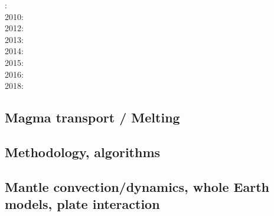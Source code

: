 : \cite{gamc08}\\
2010: \cite{stto10}\\
2012: \cite{stto12}\\
2013: \cite{limc13}\cite{bogs13a}\\
2014: \cite{budt14}\\
2015: \cite{musd15}\cite{hafg15}\\
2016: \cite{dost16}\\
2018: \cite{daga18}

\subsection*{Magma transport / Melting}

\cite{yatd12}
\cite{lorg18}

\subsection*{Methodology, algorithms}

\cite{leka93}

\subsection*{Mantle convection/dynamics, whole Earth models, plate interaction}

